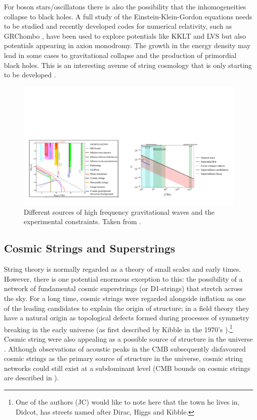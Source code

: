 For boson stars/oscillatons there is also the possibility that the inhomogeneities collapse to black holes. A full study of the Einstein-Klein-Gordon equations needs to be studied and recently developed codes for numerical relativity, such as GRChombo \cite{Andrade:2021rbd}, have been used to explore potentials like KKLT and LVS but also potentials appearing in axion monodromy. The growth in the energy density may lead in some cases to gravitational collapse and the production of primordial black holes. This is an interesting avenue of string cosmology that is only starting to be developed \cite{Krippendorf:2018tei, Muia:2019coe, Nazari:2020fmk}.

\begin{figure}[H]
    \centering
    \includegraphics[width = 1.1\textwidth]{Sections/Figures/UHF-GW.pdf} 
    \caption{Different sources of high frequency gravitational waves and the experimental constraints. Taken from \cite{Aggarwal:2020olq}.}
    \label{fig:UHFGW}
\end{figure}

\subsection{Cosmic Strings and Superstrings}
% 

String theory is normally regarded as a theory of small scales and early times. However, there is one potential enormous exception to this: the possibility of a network of fundamental cosmic superstrings (or D1-strings) that stretch across the sky. For a long time, cosmic strings were regarded alongside inflation as one of the leading candidates to explain the origin of structure; in a field theory they have a natural origin as topological defects formed during processes of symmetry breaking in the early universe (as first described by Kibble in the 1970's \cite{Kibble:1976sj}).\footnote{One of the authors (JC) would like to note here that the town he lives in, Didcot, has streets named after Dirac, Higgs and Kibble.} Cosmic string were also appealing as a possible source of structure in the universe \cite{Zeldovich:1980gh, Vilenkin:1981iu}. Although observations of acoustic peaks in the CMB subsequently disfavoured cosmic strings as the primary source of structure in the universe, cosmic string networks could still exist at a subdominant level (CMB bounds on cosmic strings are described in \cite{Planck:2013mgr}).

